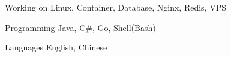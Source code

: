 

\begin{cvskills}

  \cvskill
    {Working on} %
    {Linux, Container, Database, Nginx, Redis, VPS} %

  \cvskill
    {Programming} %
    {Java, C\#, Go, Shell(Bash)} %

  \cvskill
    {Languages} %
    {English, Chinese} %

\end{cvskills}
